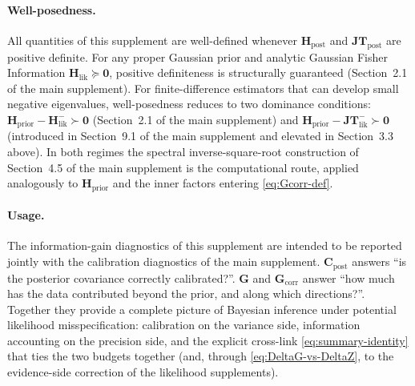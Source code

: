 \documentclass[11pt]{article}
\begin{document}
\paragraph{Well-posedness.}
All quantities of this supplement are well-defined whenever $\mathbf H_{\mathrm{post}}$ and $\mathbf{JT}_{\mathrm{post}}$ are positive definite. For any proper Gaussian prior and analytic Gaussian Fisher Information $\mathbf H_{\mathrm{lik}} \succeq \mathbf 0$, positive definiteness is structurally guaranteed (Section~2.1 of the main supplement). For finite-difference estimators that can develop small negative eigenvalues, well-posedness reduces to two dominance conditions: $\mathbf H_{\mathrm{prior}} - \mathbf H_{\mathrm{lik}}^- \succ \mathbf 0$ (Section~2.1 of the main supplement) and $\mathbf H_{\mathrm{prior}} - \mathbf{JT}_{\mathrm{lik}}^- \succ \mathbf 0$ (introduced in Section~9.1 of the main supplement and elevated in Section~3.3 above). In both regimes the spectral inverse-square-root construction of Section~4.5 of the main supplement is the computational route, applied analogously to $\mathbf H_{\mathrm{prior}}$ and the inner factors entering \eqref{eq:Gcorr-def}.

\paragraph{Usage.}
The information-gain diagnostics of this supplement are intended to be reported jointly with the calibration diagnostics of the main supplement. $\mathbf C_{\mathrm{post}}$ answers ``is the posterior covariance correctly calibrated?''. $\mathbf G$ and $\mathbf G_{\mathrm{corr}}$ answer ``how much has the data contributed beyond the prior, and along which directions?''. Together they provide a complete picture of Bayesian inference under potential likelihood misspecification: calibration on the variance side, information accounting on the precision side, and the explicit cross-link \eqref{eq:summary-identity} that ties the two budgets together (and, through \eqref{eq:DeltaG-vs-DeltaZ}, to the evidence-side correction of the likelihood supplements).
\end{document}
